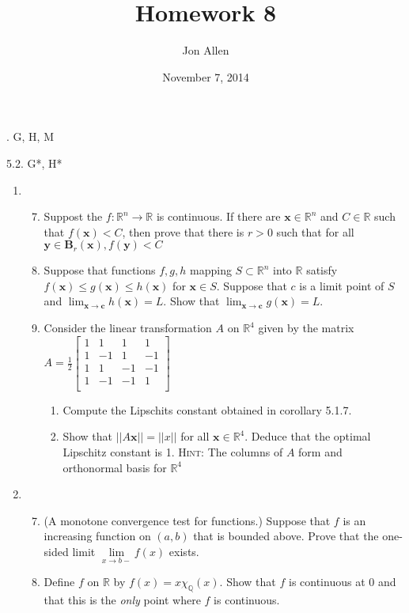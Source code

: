 \documentclass[letterpaper]{article}
\begin{document}
\title{Homework 8}
\date{November 7, 2014}
\author{Jon Allen}
. G, H, M

5.2. G*, H*

\renewcommand{\labelenumi}{5.\arabic{enumi}}
\renewcommand{\labelenumii}{\Alph{enumii}.}
\renewcommand{\labelenumiii}{(\alph{enumiii})}
\begin{enumerate}
\item
  \begin{enumerate}
  \setcounter{enumii}{6}
  \item
    Suppost the $f:\mathbb{R}^n\to\mathbb{R}$ is continuous. If there are $\boldsymbol{x}\in \mathbb{R}^n$ and $C\in \mathbb{R}$ such that $f(\boldsymbol{x})<C$, then prove that there is $r>0$ such that for all $\boldsymbol{y}\in \boldsymbol{B}_r(\boldsymbol{x}),f(\boldsymbol{y})<C$
  \item
    Suppose that functions $f,g,h$ mapping $S\subset \mathbb{R}^n$ into $\mathbb{R}$ satisfy $f(\boldsymbol{x})\le g(\boldsymbol{x})\le h(\boldsymbol{x})$ for $\boldsymbol{x}\in S$. Suppose that $c$ is a limit point of $S$ and $\lim_{\boldsymbol{x}\to\boldsymbol{c}}h(\boldsymbol{x})=L$. Show that $\lim_{\boldsymbol{x}\to\boldsymbol{c}}g(\boldsymbol{x})=L$.
  \setcounter{enumii}{12}
  \item
    Consider the linear transformation $A$ on $\mathbb{R}^4$ given by the matrix
    $A=\frac{1}{2}
    \left[
    \begin{array}{rrrr}
    1&1&1&1\\
    1&-1&1&-1\\
    1&1&-1&-1\\
    1&-1&-1&1\\
    \end{array}
    \right]$
    \begin{enumerate}
    \item
      Compute the Lipschits constant obtained in corollary 5.1.7.
    \item
      Show that $||A\boldsymbol{x}||=||x||$ for all $\boldsymbol{x}\in \mathbb{R}^4$. Deduce that the optimal Lipschitz constant is 1.
      {\scshape Hint:} The columns of $A$ form and orthonormal basis for $\mathbb{R}^4$
    \end{enumerate}
  \end{enumerate}
\item
  \begin{enumerate}
  \setcounter{enumii}{6}
  \item
    (A monotone convergence test for functions.) Suppose that $f$ is an increasing function on $(a,b)$ that is bounded above. Prove that the one-sided limit $\lim\limits_{x\to b-}f(x)$ exists.
  \item
    Define $f$ on $\mathbb{R}$ by $f(x)=x\chi_\mathbb{Q}(x)$. Show that $f$ is continuous at 0 and that this is the {\em only} point where $f$ is continuous.
  \end{enumerate}
\end{enumerate}
\end{document}
